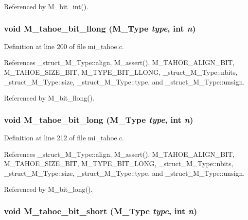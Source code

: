 Referenced by M\_\-bit\_\-int().
\subsubsection{\setlength{\rightskip}{0pt plus 5cm}void M\_\-tahoe\_\-bit\_\-llong (\bf{M\_\-Type} {\em type}, int {\em n})}\label{m__tahoe_8h_eea59b82c8e601d5428ad72549791743}




Definition at line 200 of file mi\_\-tahoe.c.

References \_\-struct\_\-M\_\-Type::align, M\_\-assert(), M\_\-TAHOE\_\-ALIGN\_\-BIT, M\_\-TAHOE\_\-SIZE\_\-BIT, M\_\-TYPE\_\-BIT\_\-LLONG, \_\-struct\_\-M\_\-Type::nbits, \_\-struct\_\-M\_\-Type::size, \_\-struct\_\-M\_\-Type::type, and \_\-struct\_\-M\_\-Type::unsign.

Referenced by M\_\-bit\_\-llong().
\subsubsection{\setlength{\rightskip}{0pt plus 5cm}void M\_\-tahoe\_\-bit\_\-long (\bf{M\_\-Type} {\em type}, int {\em n})}\label{m__tahoe_8h_69b7fbdb4a30e5f0e03d027edf26d711}




Definition at line 212 of file mi\_\-tahoe.c.

References \_\-struct\_\-M\_\-Type::align, M\_\-assert(), M\_\-TAHOE\_\-ALIGN\_\-BIT, M\_\-TAHOE\_\-SIZE\_\-BIT, M\_\-TYPE\_\-BIT\_\-LONG, \_\-struct\_\-M\_\-Type::nbits, \_\-struct\_\-M\_\-Type::size, \_\-struct\_\-M\_\-Type::type, and \_\-struct\_\-M\_\-Type::unsign.

Referenced by M\_\-bit\_\-long().
\subsubsection{\setlength{\rightskip}{0pt plus 5cm}void M\_\-tahoe\_\-bit\_\-short (\bf{M\_\-Type} {\em type}, int {\em n})}\label{m__tahoe_8h_29a13507ca727d0d1b9f9f0c964140fe}




